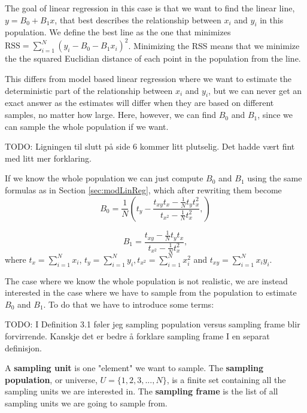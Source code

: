 \documentclass{article}
\begin{document}
The goal of linear regression in this case is that we want to find the linear
line, \(y = B_0 + B_1x\), that best describes the relationship between \(x_i\)
and \(y_i\) in this population. We define the best line as the one
that minimizes \(\mathrm{RSS} = \sum_{i = 1}^N (y_i - B_0 - B_1 x_i)^2\).
Minimizing the RSS means that we minimize the the squared Euclidian distance of each point
in the population from the line.

This differs from model based linear regression where we want to estimate the
deterministic part of the relationship between \(x_i\) and \(y_i\), but we can
never get an exact answer as the estimates will differ when they are based on
different samples, no matter how large. Here, however, we can find \(B_0\) and
\(B_1\), since we can sample the whole population if we want.

TODO:  Ligningen til slutt på side 6 kommer litt plutselig. Det hadde vært fint med litt mer forklaring.


If we know the whole population we can just compute \(B_0\) and \(B_1\) using the same formulas
as in Section \ref{sec:modLinReg}, which after rewriting them become
\begin{equation*}
 B_0 = \frac{1}{N} \left( t_y - \frac{t_{xy} t_x - \frac{1}{N} t_y t_x^2}
   {t_{x^2} - \frac{1}{N} t_x^2},
  \right)
\end{equation*}

\begin{equation*}
 B_1 = \frac{t_{xy} - \frac{1}{N} t_y t_x}
   {t_{x^2} - \frac{1}{N} t_x^2},
\end{equation*}
where \(t_x = \sum_{i = 1}^N x_i\), \(t_y = \sum_{i = 1}^N y_i, t_{x^2} =
\sum_{i = 1}^N x_i^2\) and \(t_{xy} =
\sum_{i = 1}^N x_i y_i\).

The case where we know the whole population is not realistic, we are instead interested in the case where we have to sample from the
population to estimate \(B_0\) and \(B_1\). To do that we have to introduce some terms:

TODO: I Definition 3.1 føler jeg sampling population versus sampling frame blir forvirrende. Kanskje det er bedre å forklare sampling frame I en separat definisjon.


\begin{definition} \label{def:sampUnitPopFrame}
 A \textbf{sampling unit} is one "element" we want to sample.
 The \textbf{sampling population}, or universe, \(U = \{1, 2, 3, ..., N\}\), is a
 finite set containing all the sampling units we are interested in. 
 The \textbf{sampling frame} is the list of all sampling units we are going to sample from. 
\end{definition}
\end{document}
